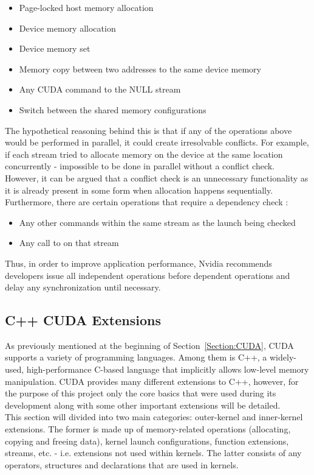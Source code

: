 \begin{itemize}
	\item Page-locked host memory allocation
	\item Device memory allocation
	\item Device memory set
	\item Memory copy between two addresses to the same device memory
	\item Any CUDA command to the NULL stream
	\item Switch between the shared memory configurations
\end{itemize}

The hypothetical reasoning behind this is that if any of the operations above would be performed in parallel, it could create irresolvable conflicts. For example, if each stream tried to allocate memory on the device at the same location concurrently - impossible to be done in parallel without a conflict check. However, it can be argued that a conflict check is an unnecessary functionality as it is already present in some form when allocation happens sequentially. \\
Furthermore, there are certain operations that require a dependency check \cite{NVIDIAMay2022}:

\begin{itemize}
	\item Any other commands within the same stream as the launch being checked
	\item Any call to  on that stream
\end{itemize}

Thus, in order to improve application performance, Nvidia recommends developers issue all independent operations before dependent operations and delay any synchronization until necessary.


\subsection{C++ CUDA Extensions}\label{Subsection:CUDA-C++-extensions}
As previously mentioned at the beginning of Section~\ref{Section:CUDA}, CUDA supports a variety of programming languages. Among them is C++, a widely-used, high-performance C-based language that implicitly allows low-level memory manipulation. CUDA provides many different extensions to C++, however, for the purpose of this project only the core basics that were used during its development along with some other important extensions will be detailed. \\
This section will divided into two main categories: outer-kernel and inner-kernel extensions. The former is made up of memory-related operations (allocating, copying and freeing data), kernel launch configurations, function extensions, streams, etc. - i.e. extensions not used within kernels. The latter consists of any operators, structures and declarations that are used in kernels.

